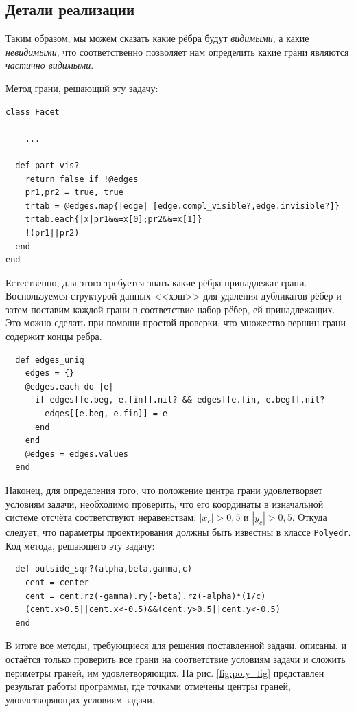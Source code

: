 \subsection{Детали реализации}

Таким образом, мы можем сказать какие рёбра будут \emph{видимыми}, а какие \emph{невидимыми}, что соответственно позволяет нам определить какие грани являются \emph{частично видимыми}.

Метод грани, решающий эту задачу:
\begin{lstlisting}
class Facet
    
    ...

  def part_vis?
    return false if !@edges
    pr1,pr2 = true, true
    trtab = @edges.map{|edge| [edge.compl_visible?,edge.invisible?]}
    trtab.each{|x|pr1&&=x[0];pr2&&=x[1]}
    !(pr1||pr2)
  end 
end
\end{lstlisting}

Естественно, для этого требуется знать какие рёбра принадлежат грани. Воспользуемся структурой данных <<хэш>> для удаления дубликатов рёбер и затем поставим каждой грани в соответствие набор рёбер, ей принадлежащих. Это можно сделать при помощи простой проверки, что множество вершин грани содержит концы ребра.
\begin{lstlisting}
  def edges_uniq
    edges = {}
    @edges.each do |e|
      if edges[[e.beg, e.fin]].nil? && edges[[e.fin, e.beg]].nil?
        edges[[e.beg, e.fin]] = e
      end
    end
    @edges = edges.values
  end
\end{lstlisting}

Наконец, для определения того, что положение центра грани удовлетворяет условиям задачи, необходимо проверить, что его координаты  в изначальной системе отсчёта соответствуют неравенствам:
$|x_c|>0,5$ и $|y_c|>0,5$. Откуда следует, что параметры проектирования должны быть известны в классе \verb|Polyedr|. 
Код метода, решающего эту задачу:
\begin{lstlisting}
  def outside_sqr?(alpha,beta,gamma,c)
    cent = center
    cent = cent.rz(-gamma).ry(-beta).rz(-alpha)*(1/c)
    (cent.x>0.5||cent.x<-0.5)&&(cent.y>0.5||cent.y<-0.5)
  end
\end{lstlisting}

В итоге все методы, требующиеся для решения поставленной задачи, описаны, и остаётся только проверить все грани на соответствие условиям задачи и сложить периметры граней, им удовлетворяющих.
На рис. \ref{fig:poly_fig} представлен результат работы программы, где точками отмечены центры граней, удовлетворяющих условиям задачи.

